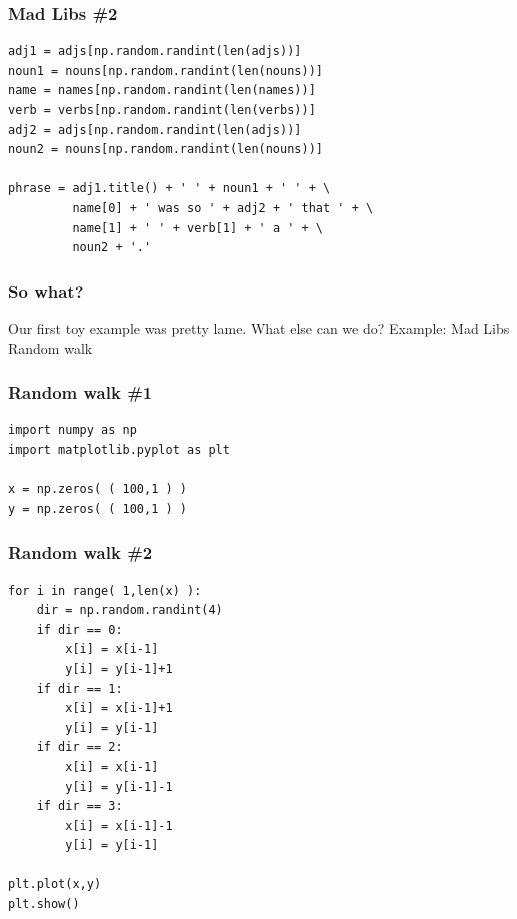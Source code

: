 \documentclass[11pt]{beamer}
\begin{document}
\begin{frame}[fragile]
  \frametitle{Mad Libs \#2}

  \begin{Verbatim}
adj1 = adjs[np.random.randint(len(adjs))]
noun1 = nouns[np.random.randint(len(nouns))]
name = names[np.random.randint(len(names))]
verb = verbs[np.random.randint(len(verbs))]
adj2 = adjs[np.random.randint(len(adjs))]
noun2 = nouns[np.random.randint(len(nouns))]

phrase = adj1.title() + ' ' + noun1 + ' ' + \
         name[0] + ' was so ' + adj2 + ' that ' + \
         name[1] + ' ' + verb[1] + ' a ' + \
         noun2 + '.'
  \end{Verbatim}
\end{frame}

\begin{frame}[fragile]
  \frametitle{So what?}
  \Enlarge

  \begin{enumerate}
  \myitem  Our first toy example was pretty lame.  What else can we do?
  \myitem    Example:  Mad Libs
  \myitem    Random walk
  \end{enumerate}
\end{frame}

\begin{frame}[fragile]
  \frametitle{Random walk \#1}

  \begin{Verbatim}
import numpy as np
import matplotlib.pyplot as plt

x = np.zeros( ( 100,1 ) )
y = np.zeros( ( 100,1 ) )
  \end{Verbatim}
\end{frame}

\begin{frame}[fragile]
  \frametitle{Random walk \#2}

  \begin{Verbatim}
for i in range( 1,len(x) ):
    dir = np.random.randint(4)
    if dir == 0:
        x[i] = x[i-1]
        y[i] = y[i-1]+1
    if dir == 1:
        x[i] = x[i-1]+1
        y[i] = y[i-1]
    if dir == 2:
        x[i] = x[i-1]
        y[i] = y[i-1]-1
    if dir == 3:
        x[i] = x[i-1]-1
        y[i] = y[i-1]

plt.plot(x,y)
plt.show()
  \end{Verbatim}
\end{frame}
\end{document}
